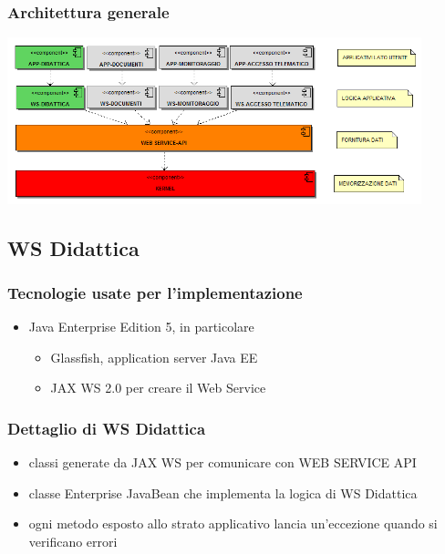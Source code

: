 \begin{frame}
\frametitle{Architettura generale}

\begin{center}
  \includegraphics[width=12cm]{../../immagini/ArchitetturaGenerale.png}
\end{center}
\end{frame}

\subsection{WS Didattica}

\begin{frame}
\frametitle{Tecnologie usate per l'implementazione}

\begin{itemize}
\item Java Enterprise Edition 5, in particolare

\begin{itemize}
\item Glassfish, application server Java EE
\item JAX WS 2.0 per creare il Web Service
\end{itemize}

\end{itemize}

\end{frame}

\begin{frame}
\frametitle{Dettaglio di WS Didattica}

\begin{itemize}
\item classi generate da JAX WS per comunicare con WEB SERVICE API
\item classe Enterprise JavaBean che implementa la logica di WS Didattica
\item ogni metodo esposto allo strato applicativo lancia un'eccezione quando si verificano errori
\end{itemize}


\end{frame}

